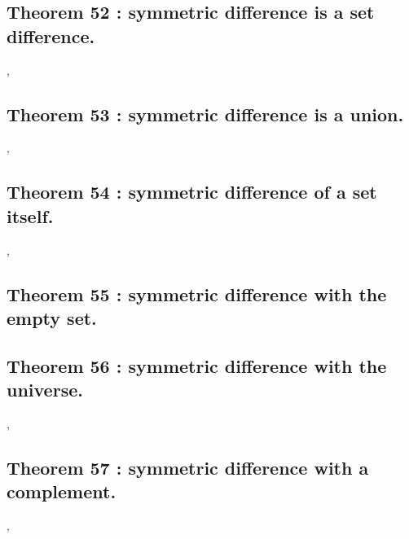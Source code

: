 \documentclass[preview]{standalone}
\begin{document}
\subsection[Symmetric difference is a set difference.]
    {
        \color{section}Theorem 52 \color{black} : symmetric difference is a set difference.
    }

\sep
\pagebreak


\subsection[Symmetric difference is a union.]
    {
        \color{section}Theorem 53 \color{black} : symmetric difference is a union.
    }

\sep


\subsection[Symmetric difference between a set and itself.]
    {
        \color{section}Theorem 54 \color{black} : symmetric difference of a set itself.
    }

\sep


\subsection[Symmetric difference with the empty set.]
    {
        \color{section}Theorem 55 \color{black} : symmetric difference with the empty set.
    }

\pagebreak


\subsection[Symmetric difference with the universe.]
    {
        \color{section}Theorem 56 \color{black} : symmetric difference with the universe.
    }

\sep


\subsection[Symmetric difference with a complement.]
    {
        \color{section}Theorem 57 \color{black} : symmetric difference with a complement.
    }

\sep
\end{document}
